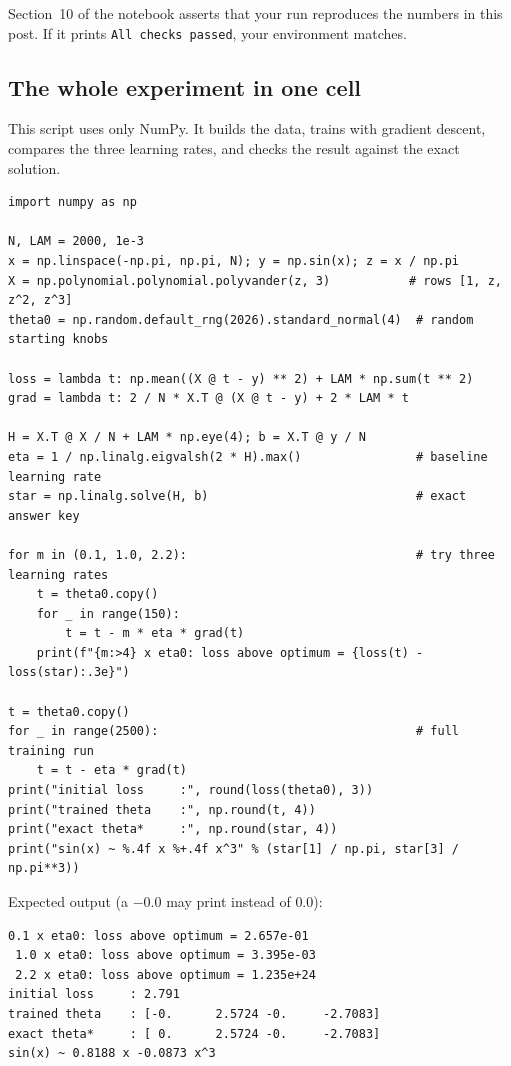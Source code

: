 \documentclass[11pt]{article}
\begin{document}
Section~10 of the notebook asserts that your run reproduces the numbers in this post. If it prints \texttt{All checks passed}, your environment matches.

\subsection{The whole experiment in one cell}
\label{sec:onecell}
This script uses only NumPy. It builds the data, trains with gradient descent, compares the three learning rates, and checks the result against the exact solution.

\begin{lstlisting}
import numpy as np

N, LAM = 2000, 1e-3
x = np.linspace(-np.pi, np.pi, N); y = np.sin(x); z = x / np.pi
X = np.polynomial.polynomial.polyvander(z, 3)           # rows [1, z, z^2, z^3]
theta0 = np.random.default_rng(2026).standard_normal(4)  # random starting knobs

loss = lambda t: np.mean((X @ t - y) ** 2) + LAM * np.sum(t ** 2)
grad = lambda t: 2 / N * X.T @ (X @ t - y) + 2 * LAM * t

H = X.T @ X / N + LAM * np.eye(4); b = X.T @ y / N
eta = 1 / np.linalg.eigvalsh(2 * H).max()                # baseline learning rate
star = np.linalg.solve(H, b)                             # exact answer key

for m in (0.1, 1.0, 2.2):                                # try three learning rates
    t = theta0.copy()
    for _ in range(150):
        t = t - m * eta * grad(t)
    print(f"{m:>4} x eta0: loss above optimum = {loss(t) - loss(star):.3e}")

t = theta0.copy()
for _ in range(2500):                                    # full training run
    t = t - eta * grad(t)
print("initial loss     :", round(loss(theta0), 3))
print("trained theta    :", np.round(t, 4))
print("exact theta*     :", np.round(star, 4))
print("sin(x) ~ %.4f x %+.4f x^3" % (star[1] / np.pi, star[3] / np.pi**3))
\end{lstlisting}

Expected output (a $-0.0$ may print instead of $0.0$):
\begin{lstlisting}[language={},basicstyle=\ttfamily\small]
 0.1 x eta0: loss above optimum = 2.657e-01
 1.0 x eta0: loss above optimum = 3.395e-03
 2.2 x eta0: loss above optimum = 1.235e+24
initial loss     : 2.791
trained theta    : [-0.      2.5724 -0.     -2.7083]
exact theta*     : [ 0.      2.5724 -0.     -2.7083]
sin(x) ~ 0.8188 x -0.0873 x^3
\end{lstlisting}
\end{document}

